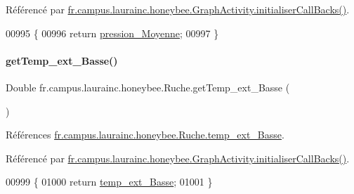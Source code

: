 Référencé par \hyperlink{classfr_1_1campus_1_1laurainc_1_1honeybee_1_1_graph_activity_a8dc56c3e0744bcb9295ad10e726b5fdb}{fr.\+campus.\+laurainc.\+honeybee.\+Graph\+Activity.\+initialiser\+Call\+Backs()}.


\begin{DoxyCode}
00995                                         \{
00996         \textcolor{keywordflow}{return} \hyperlink{classfr_1_1campus_1_1laurainc_1_1honeybee_1_1_ruche_afcfb5de514add7b23ac40ecf0913ba0f}{pression\_Moyenne};
00997     \}
\end{DoxyCode}
\mbox{\label{classfr_1_1campus_1_1laurainc_1_1honeybee_1_1_ruche_a9786179ed3c1314197607f3ad2bcca8c}} 
\paragraph{\texorpdfstring{get\+Temp\+\_\+ext\+\_\+\+Basse()}{getTemp\_ext\_Basse()}}
{\footnotesize\ttfamily Double fr.\+campus.\+laurainc.\+honeybee.\+Ruche.\+get\+Temp\+\_\+ext\+\_\+\+Basse (\begin{DoxyParamCaption}{ }\end{DoxyParamCaption})}



Références \hyperlink{classfr_1_1campus_1_1laurainc_1_1honeybee_1_1_ruche_ad7171f31281b9e806b7622473bf5d8f1}{fr.\+campus.\+laurainc.\+honeybee.\+Ruche.\+temp\+\_\+ext\+\_\+\+Basse}.



Référencé par \hyperlink{classfr_1_1campus_1_1laurainc_1_1honeybee_1_1_graph_activity_a8dc56c3e0744bcb9295ad10e726b5fdb}{fr.\+campus.\+laurainc.\+honeybee.\+Graph\+Activity.\+initialiser\+Call\+Backs()}.


\begin{DoxyCode}
00999                                       \{
01000         \textcolor{keywordflow}{return} \hyperlink{classfr_1_1campus_1_1laurainc_1_1honeybee_1_1_ruche_ad7171f31281b9e806b7622473bf5d8f1}{temp\_ext\_Basse};
01001     \}
\end{DoxyCode}
\mbox{\label{classfr_1_1campus_1_1laurainc_1_1honeybee_1_1_ruche_a3ce0db4489e1258c7c755c1692f21f04}} 
